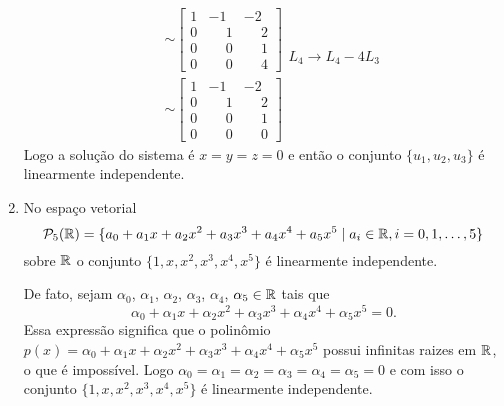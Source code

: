 \begin{exemplos}
\begin{enumerate}
\begin{solucao}
\begin{align*}
\begin{array}{l}
          \end{array}\\&\sim
          \begin{bmatrix}
            1 & -1 & -2\\
            0 & \phantom{-} 1 & \phantom{-} 2\\
            0 & \phantom{-} 0 & \phantom{-} 1\\
            0 & \phantom{-} 0 & \phantom{-} 4
          \end{bmatrix}
          \begin{array}{l}
            \phantom{x}\\\phantom{x}\\\phantom{x}\\L_4 \to L_4 - 4L_3
          \end{array}\\&\sim
          \begin{bmatrix}
            1 & -1 & -2\\
            0 & \phantom{-} 1 & \phantom{-} 2\\
            0 & \phantom{-} 0 & \phantom{-} 1\\
            0 & \phantom{-} 0 & \phantom{-} 0
          \end{bmatrix}
        \end{align*}
        Logo a solução do sistema é $x = y = z = 0$ e então o conjunto $\{u_1, u_2, u_3\}$ é linearmente independente.
      \end{solucao}
      
    \item No espaço vetorial
      \[
        \mathcal{P}_5(\mathbb{R}) = \{a_0 + a_1x + a_2x^2 + a_3x^3 + a_4x^4 + a_5x^5 \mid a_i \in \mathbb{R}, i = 0, 1, \dots, 5 \}
      \]
      sobre $\mathbb{R}$ o conjunto $\{1, x, x^2, x^3, x^4, x^5\}$ é linearmente independente.
      \begin{solucao}
        De fato, sejam $\alpha_0$, $\alpha_1$, $\alpha_2$, $\alpha_3$, $\alpha_4$, $\alpha_5 \in \mathbb{R}$ tais que
        \[
          \alpha_0 + \alpha_1x + \alpha_2x^2 + \alpha_3x^3 + \alpha_4x^4 + \alpha_5x^5 = 0.
        \]
        Essa expressão significa que o polinômio $p(x) = \alpha_0 + \alpha_1x + \alpha_2x^2 + \alpha_3x^3 + \alpha_4x^4 + \alpha_5x^5$ possui infinitas raizes em $\mathbb{R}$, o que é impossível. Logo
        $\alpha_0 = \alpha_1 = \alpha_2 = \alpha_3 = \alpha_4 = \alpha_5 = 0$ e com isso o conjunto $\{1, x, x^2, x^3, x^4, x^5\}$ é linearmente independente.
      \end{solucao}
      

\end{enumerate}
\end{exemplos}
